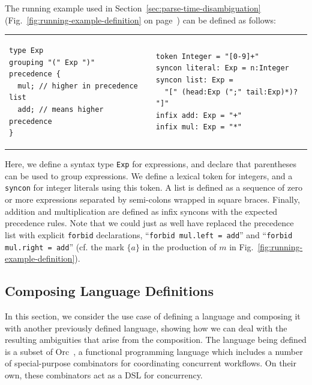 \documentclass[runningheads]{llncs}
\newcommand{\syncon}{\lstinline[language=syncon]}
\begin{document}
The running example used in
Section~\ref{sec:parse-time-disambiguation}
(Fig.~\ref{fig:running-example-definition} on
page~\pageref{fig:running-example-definition}) can be defined as
follows:

\begin{tabular}{ll}
\small
\begin{lstlisting}[language=syncon,boxpos=t]
type Exp
grouping "(" Exp ")"
precedence {
  mul; // higher in precedence list
  add; // means higher precedence
}
\end{lstlisting}
&
\small
\begin{lstlisting}[language=syncon,boxpos=t]
token Integer = "[0-9]+"
syncon literal: Exp = n:Integer
syncon list: Exp =
  "[" (head:Exp (";" tail:Exp)*)? "]"
infix add: Exp = "+"
infix mul: Exp = "*"
\end{lstlisting}
\end{tabular}\smallskip

\noindent Here, we define a syntax type \syncon{Exp} for
expressions, and declare that parentheses can be used to group
expressions. We define a lexical token for integers, and a
\syncon{syncon} for integer literals using this token. A list is
defined as a sequence of zero or more expressions separated by
semi-colons wrapped in square braces. Finally, addition and
multiplication are defined as infix syncons with the expected
precedence rules. Note that we could just as well have replaced
the precedence list with explicit \syncon{forbid} declarations,
``\syncon{forbid mul.left = add}'' and ``\syncon{forbid mul.right = add}''
(cf. the mark $\{a\}$ in the production of $m$ in
Fig.~\ref{fig:running-example-definition}).



\subsection{Composing Language Definitions} \label{sec:evaluation-orc}

In this section, we consider the use case of defining a language
and composing it with another previously defined language, showing
how we can deal with the resulting ambiguities that arise from the
composition.
%
The language being defined is a subset of
Orc~\cite{kitchinOrc2009}, a functional programming language which
includes a number of special-purpose combinators for coordinating
concurrent workflows. On their own, these combinators act as a DSL
for concurrency.
\end{document}
